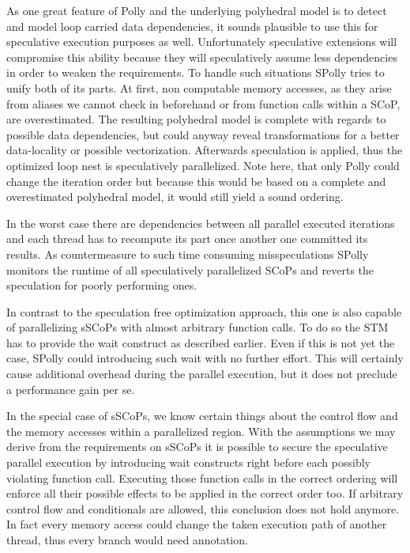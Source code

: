 As one great feature of Polly and the underlying polyhedral model
is to detect and model loop carried data dependencies, it sounds plausible to
use this for speculative execution purposes as well. Unfortunately speculative 
extensions will compromise this ability because they will speculatively assume less
dependencies in order to weaken the requirements. 
To handle such situations SPolly tries to unify both of its parts. 
At first, non computable memory accesses, as they arise from 
aliases we cannot check in beforehand or from function calls within a SCoP, are
overestimated. The resulting polyhedral model is complete with regards to possible
data dependencies, but could anyway reveal transformations for a 
better data-locality or possible vectorization. 
Afterwards speculation is applied, thus the optimized loop nest is
speculatively  parallelized. Note here, that only Polly could change the iteration 
order but because this would be based on a complete and overestimated polyhedral model, 
it would still yield a sound ordering. 

In the worst case there are dependencies between all parallel executed iterations
and each thread has to recompute its part once another one committed its results.
As countermeasure to such time consuming misspeculations SPolly monitors 
the runtime of all speculatively parallelized SCoPs and reverts the speculation 
for poorly performing ones.

In contrast to the speculation free optimization approach, this one is also
capable of parallelizing sSCoPs with almost arbitrary function calls. To do so the
STM has to provide the  wait construct as described earlier. 
Even if this is not yet the case, SPolly could introducing such wait with no further effort. 
This will certainly cause additional overhead during the parallel execution, 
but it does not preclude a performance gain per se.

In the special case of sSCoPs, we know certain things about the 
control flow and the memory accesses within a parallelized region. 
With the assumptions we may derive from the requirements on sSCoPs it is possible
to secure the speculative parallel execution by introducing wait constructs 
right before each possibly violating function call. Executing those function calls
in the correct ordering will enforce all their possible effects to be applied 
in the correct order too. 
If arbitrary control flow and conditionals are allowed, this conclusion does not
hold anymore. In fact every memory access could change the taken execution path of 
another thread, thus every branch would need annotation. 



